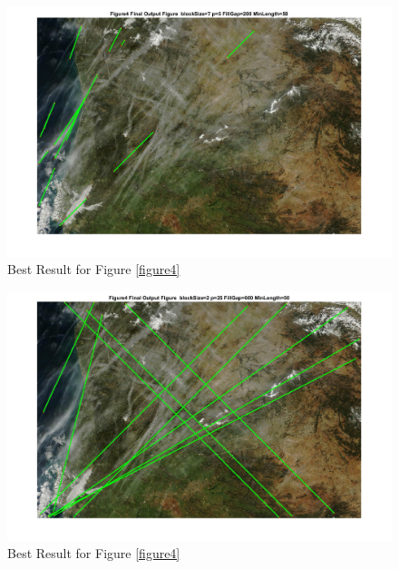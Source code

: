 





	\begin{figure}[hbtp]
		\centering
		\includegraphics[width=6in]{pic/Figure4_best.jpg}
		\caption{Best Result for Figure \ref{figure4}}
		\label{Figure4_best}
	\end{figure}


	\begin{figure}[hbtp]
		\centering
		\includegraphics[width=6in]{pic/Figure4_worst.jpg}
		\caption{Best Result for Figure \ref{figure4}}
		\label{Figure4_worst}
	\end{figure}


